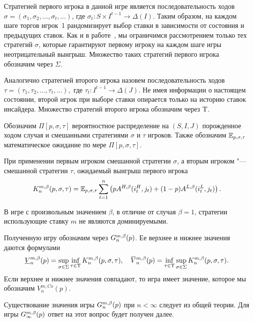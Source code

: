 Стратегией первого игрока в данной игре является последовательность ходов %
$\sigma = (\sigma_1, \sigma_2, \ldots, \sigma_t, \ldots)$, где %
$\sigma_t: S \times I^{t-1} \rightarrow \Delta(I)$. Таким образом, на каждом
шаге торгов игрок~1 рандомизирует выбор ставки в зависимости от состояния и
предыдущих ставок. Как и в работе~\cite{domansky07}, мы ограничимся
рассмотрением только тех стратегий $\sigma$, которые гарантируют первому игроку
на каждом шаге игры неотрицательный выигрыш. Множество таких стратегий первого
игрока обозначим через $\Sigma$.

Аналогично стратегией второго игрока назовем последовательность ходов $\tau =
(\tau_1, \tau_2, \ldots, \tau_t, \ldots),$ где $\tau_t: I^{t-1} \rightarrow
\Delta(J)$. Не имея информации о настоящем состоянии, второй игрок при выборе
ставки опирается только на историю ставок инсайдера. Множество стратегий второго
игрока обозначим через $\mathrm{T}$.

Обозначим $\Pi[p, \sigma, \tau]$ вероятностное распределение на $(S, I, J)$
порожденное ходом случая и смешанными стратегиями $\sigma$ и $\tau$ игроков.
Также обозначим $\operatorname{\mathbb{E}}_{p,\sigma,\tau}$ математическое ожидание по мере $\Pi[p,
\sigma, \tau]$.

При применении первым игроком смешанной стратегии $\sigma$, а вторым игроком
"--- смешанной стратегии $\tau$, ожидаемый выигрыш первого игрока
\begin{equation}
  \label{eq:firstPlayerPayoff}
  K^{m,\beta}_n(p, \sigma, \tau) = \operatorname{\mathbb{E}}_{p,\sigma,\tau} \sum_{t=1}^n
  \left(
    pA^{H,\beta}(i_t^H, j_t) + (1 - p)A^{L,\beta}(i_t^L, j_t)
  \right).
\end{equation}
\begin{remark}
  В игре с произвольным значением $\beta$, в отличие от случая $\beta = 1$,
  стратегии использующие ставку $m$ не являются доминируемыми.
\end{remark}
Полученную игру обозначим через $G^{m,\beta}_n(p)$. Ее верхнее и нижнее
значения даются формулами
\begin{equation*}
  \underline{V}^{m,\Co}_n(p) = \sup_{\sigma \in \Sigma} \inf_{\tau \in \Tau}
  K^{m,\Co}_n(p, \sigma, \tau), \quad
  \overbar{V}^{m,\Co}_n(p) = \inf_{\tau \in \Tau} \sup_{\sigma \in \Sigma}
  K^{m,\Co}_n(p, \sigma, \tau).
\end{equation*}
Если верхнее и нижнее значения совпадают, то игра имеет значение, которое мы
обозначим $V^{m,Co}_n(p)$.

\begin{remark}
  Существование значения игры $G^{m,\beta}_n(p)$ при $n < \infty$ следует из
  общей теории. Для игры $G^{m,\beta}_\infty(p)$ ответ на этот вопрос будет
  получен далее.
\end{remark}

